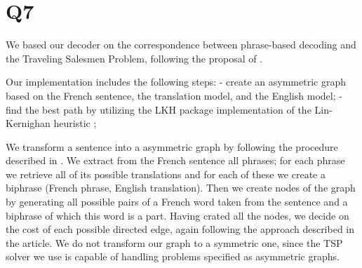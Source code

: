 \documentclass[11pt]{article}
\begin{document}
\section*{Q7}
We based our decoder on the correspondence between phrase-based decoding and the Traveling Salesmen Problem, following the proposal of \cite{zaslavskiy2009}.

Our implementation includes the following steps:
- create an asymmetric graph based on the French sentence, the translation model, and the English model;
- find the best path by utilizing the LKH package implementation of the Lin-Kernighan heuristic \cite{Helsgaun2006};

We transform a sentence into a asymmetric graph by following the procedure described in \cite{zaslavskiy2009}. We extract from the French sentence all phrases; for each phrase we retrieve all of its possible translations and for each of these we create a biphrase (French phrase, English translation). Then we create nodes of the graph by generating all possible pairs of a French word taken from the sentence and a biphrase of which this word is a part. Having crated all the nodes, we decide on the cost of each possible directed edge, again following the approach described in the article. We do not transform our graph to a symmetric one, since the TSP solver we use is capable of handling problems specified as asymmetric graphs.






\end{document}
